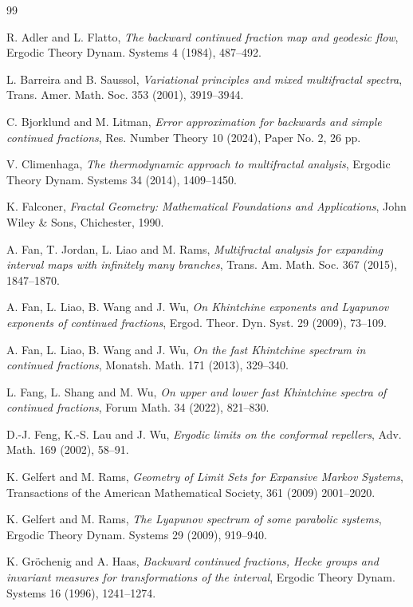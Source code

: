 \documentclass[12pt,reqno]{amsart}
\renewcommand{\=}{\coloneqq}
\theoremstyle{plain}
\begin{document}
\begin{thebibliography}{99}


 R. Adler and L. Flatto, {\it The backward continued fraction map and geodesic flow}, Ergodic Theory Dynam. Systems 4 (1984), 487--492.

 L. Barreira and B. Saussol, {\it Variational principles and mixed multifractal spectra}, Trans. Amer. Math. Soc. 353 (2001), 3919--3944.




 C. Bjorklund and M. Litman, {\it Error approximation for backwards and simple continued fractions}, Res. Number Theory 10 (2024), Paper No. 2, 26 pp.

 V. Climenhaga, {\it The thermodynamic approach to multifractal analysis}, Ergodic Theory Dynam. Systems 34 (2014), 1409--1450.

 K. Falconer, {\it Fractal Geometry: Mathematical Foundations and Applications}, John Wiley \& Sons, Chichester, 1990.

 A. Fan, T. Jordan, L. Liao and M. Rams, {\it Multifractal analysis for expanding interval maps with infinitely many branches}, Trans. Am. Math. Soc. 367 (2015), 1847--1870.

 A. Fan, L. Liao, B. Wang and J. Wu, {\it On Khintchine exponents and Lyapunov exponents of continued fractions}, Ergod. Theor. Dyn. Syst. 29 (2009), 73--109.

 A. Fan, L. Liao, B. Wang and J. Wu, {\it On the fast Khintchine spectrum in continued fractions}, Monatsh. Math. 171 (2013), 329--340.

 L. Fang, L. Shang and M. Wu, \emph{On upper and lower fast Khintchine spectra of continued fractions}, Forum Math. 34 (2022), 821--830.


 D.-J. Feng, K.-S. Lau and J. Wu, {\it Ergodic limits on the conformal repellers}, Adv. Math. 169 (2002), 58--91.



 K. Gelfert and M. Rams, {\it Geometry of Limit Sets for Expansive Markov Systems}, Transactions of the American Mathematical Society, 361 (2009)  2001--2020.


 K. Gelfert and M. Rams, {\it The Lyapunov spectrum of some parabolic systems}, Ergodic Theory Dynam. Systems 29 (2009), 919--940.

 K. Gr\"{o}chenig and A. Haas, {\it Backward continued fractions, Hecke groups and invariant measures for transformations of the interval}, Ergodic Theory Dynam. Systems 16 (1996), 1241--1274.


\end{thebibliography}
\end{document}
